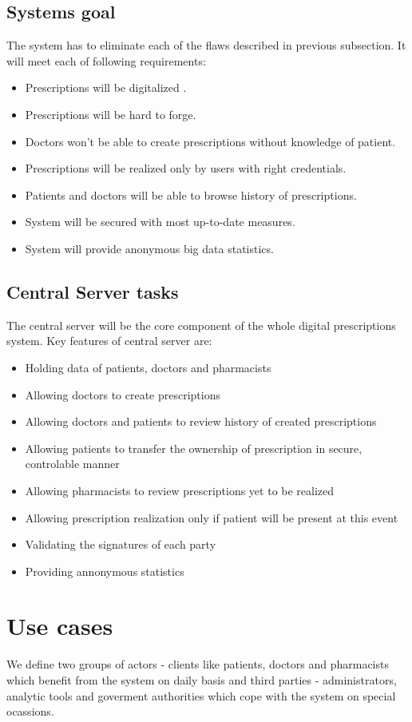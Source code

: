 \subsection{Systems goal}

The system has to eliminate each of the flaws described in previous subsection.
It will meet each of following requirements:
\begin{itemize}
\item Prescriptions will be digitalized .
\item Prescriptions will be hard to forge.
\item Doctors won't be able to create prescriptions without knowledge of patient.
\item Prescriptions will be realized only by users with right credentials.
\item Patients and doctors will be able to browse history of prescriptions.
\item System will be secured with most up-to-date measures.
\item System will provide anonymous big data statistics.
\end{itemize}

\subsection{Central Server tasks}

The central server will be the core component of the whole digital prescriptions system. Key features of central server are:
\begin{itemize}
 \item Holding data of patients, doctors and pharmacists
 \item Allowing doctors to create prescriptions
 \item Allowing doctors and patients to review history of created prescriptions
 \item Allowing patients to transfer the ownership of prescription in secure, controlable manner
 \item Allowing pharmacists to review prescriptions yet to be realized
 \item Allowing prescription realization only if patient will be present at this event
 \item Validating the signatures of each party
 \item Providing annonymous statistics
\end{itemize}

\newpage
\section{Use cases}
We define two groups of actors - clients like patients, doctors and pharmacists which benefit from the system on daily basis and third parties - administrators, analytic tools and goverment authorities which cope with the system on special ocassions.

